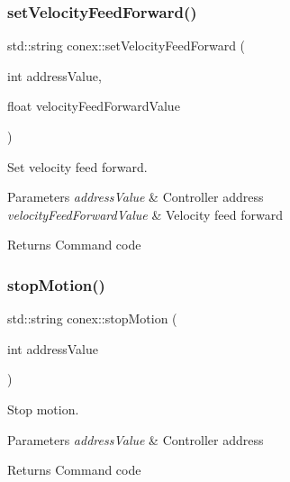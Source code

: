 \subsubsection{\texorpdfstring{set\+Velocity\+Feed\+Forward()}{setVelocityFeedForward()}}
{\footnotesize\ttfamily std\+::string conex\+::set\+Velocity\+Feed\+Forward (\begin{DoxyParamCaption}\item[{int}]{address\+Value,  }\item[{float}]{velocity\+Feed\+Forward\+Value }\end{DoxyParamCaption})}



Set velocity feed forward. 


\begin{DoxyParams}{Parameters}
{\em address\+Value} & Controller address \\
\hline
{\em velocity\+Feed\+Forward\+Value} & Velocity feed forward \\
\hline
\end{DoxyParams}
\begin{DoxyReturn}{Returns}
Command code 
\end{DoxyReturn}
\mbox{\label{namespaceconex_aa908bd9ff7a78d0b2bd7bcbe2ef7080c}} 
\subsubsection{\texorpdfstring{stop\+Motion()}{stopMotion()}}
{\footnotesize\ttfamily std\+::string conex\+::stop\+Motion (\begin{DoxyParamCaption}\item[{int}]{address\+Value }\end{DoxyParamCaption})}



Stop motion. 


\begin{DoxyParams}{Parameters}
{\em address\+Value} & Controller address \\
\hline
\end{DoxyParams}
\begin{DoxyReturn}{Returns}
Command code 
\end{DoxyReturn}
\mbox{\label{namespaceconex_a231ad931cd8782bcfd30f4b60ef2e3d8}} 
